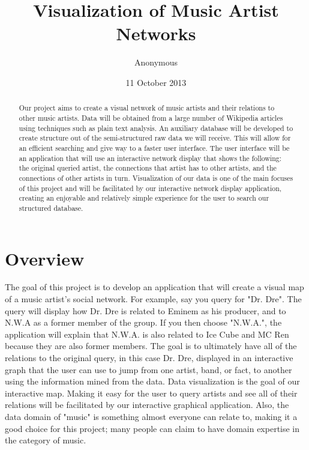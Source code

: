 \documentclass{sig-alternate}
\begin{document}
\title{Visualization of Music Artist Networks }
\author{
\alignauthor
Anonymous
}


\date{11 October 2013}
\maketitle
\begin {abstract}
Our project aims to create a visual network of music artists 
and their relations to other music artists. Data will be obtained 
from a large number of Wikipedia articles using techniques such 
as plain text analysis. An auxiliary database will be developed to 
create structure out of the semi-structured raw data we will receive. 
This will allow for an efficient searching and give way to a faster user interface. 
The user interface will be an application that will use an interactive network 
display that shows the following: the original queried artist, the 
connections that artist has to other artists, and the connections 
of other artists in turn. Visualization of our data is one of 
the main focuses of this project and will be facilitated by our
 interactive network display application, creating an enjoyable and relatively 
simple experience for the user to search our structured database.

\end{abstract}

\section{Overview}
\label{overview}
The goal of this project is to develop an application that will create 
a visual map of a music artist's social network. For example, say you query 
for "Dr. Dre". The query will display how Dr. Dre is related to Eminem as 
his producer, and to N.W.A as a former member of the group. If you then 
choose "N.W.A.", the application will explain that N.W.A. is also related to 
 Ice Cube and MC Ren because they are also former members. The goal is 
to ultimately have all of the relations to the original query, in this case Dr. Dre, 
displayed in an interactive graph that the user can use to jump from one 
artist, band, or fact, to another using the information mined from the data. 
Data visualization is the goal of our interactive map. Making it easy 
for the user to query artists and see all of their relations will 
be facilitated by our interactive graphical application. Also, the data domain 
of "music" is something almost everyone can relate to, making it 
a good choice for this project; many people can claim to have domain 
expertise in the category of music.
\end{document}
